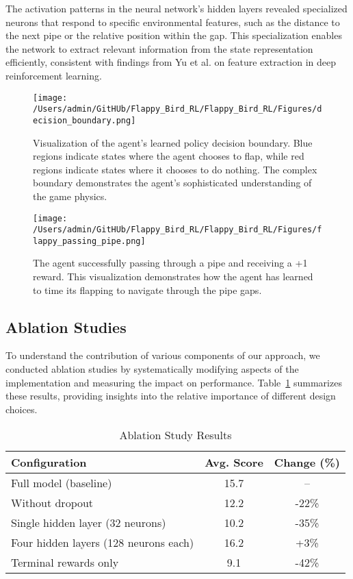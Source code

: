 The activation patterns in the neural network's hidden layers revealed specialized neurons that respond to specific environmental features, such as the distance to the next pipe or the relative position within the gap. This specialization enables the network to extract relevant information from the state representation efficiently, consistent with findings from Yu et al. \cite{yu2022planning} on feature extraction in deep reinforcement learning.
\begin{figure}[!t]
\centering
\texttt{[image: /Users/admin/GitHUb/Flappy\_Bird\_RL/Flappy\_Bird\_RL/Figures/decision\_boundary.png]}
\caption{Visualization of the agent's learned policy decision boundary. Blue regions indicate states where the agent chooses to flap, while red regions indicate states where it chooses to do nothing. The complex boundary demonstrates the agent's sophisticated understanding of the game physics.}
\label{fig:decision_boundary}
\end{figure}

\begin{figure}[!t]
\centering
\texttt{[image: /Users/admin/GitHUb/Flappy\_Bird\_RL/Flappy\_Bird\_RL/Figures/flappy\_passing\_pipe.png]}
\caption{The agent successfully passing through a pipe and receiving a +1 reward. This visualization demonstrates how the agent has learned to time its flapping to navigate through the pipe gaps.}
\label{fig:passing_pipe}
\end{figure}

\subsection{Ablation Studies}

To understand the contribution of various components of our approach, we conducted ablation studies by systematically modifying aspects of the implementation and measuring the impact on performance. Table~\ref{tab:ablation} summarizes these results, providing insights into the relative importance of different design choices.

\begin{table}[!t]
\caption{Ablation Study Results}
\label{tab:ablation}
\centering
\begin{tabular}{|l|c|c|}
\hline
\textbf{Configuration} & \textbf{Avg. Score} & \textbf{Change (\%)} \\
\hline
Full model (baseline) & 15.7 & -- \\
\hline
Without dropout & 12.2 & -22\% \\
\hline
Single hidden layer (32 neurons) & 10.2 & -35\% \\
\hline
Four hidden layers (128 neurons each) & 16.2 & +3\% \\
\hline
Terminal rewards only & 9.1 & -42\% \\
\hline
\end{tabular}
\end{table}

